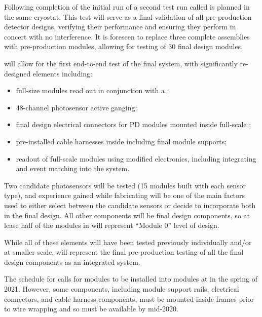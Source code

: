Following completion of the initial run of  a second test run called  is planned in the same cryostat.  This test will serve as a final validation of all pre-production  detector designs, verifying their performance and ensuring they perform in concert with no interference.  It is foreseen to replace three complete  assemblies with pre-production modules, allowing for testing of \num{30} final design  modules.  

 will allow for the first end-to-end test of the final  system, with significantly re-designed elements including:
\begin{itemize}
    \item full-size  modules read out in conjunction with a ;
    \item \num{48}-channel photosensor active ganging;
    \item final design electrical connectors for PD modules mounted inside full-scale ;
    \item pre-installed cable harnesses inside  including final module supports;
    \item readout of full-scale  modules using modified  electronics, including integrating  and  event matching into the  system.
\end{itemize}

Two candidate photosensors will be tested (\num{15} modules built with each sensor type), and experience gained while fabricating  will be one of the main factors used to either select between the candidate sensors or decide to incorporate both in the  final design.  All other components will be final design components, so at lease half of the  modules in  will represent ``Module 0'' level of design. 

While all of these elements will have been tested previously individually and/or at smaller scale,  will represent the final pre-production testing of all the final design components as an integrated system.

The schedule for  calls for  modules to be installed into  modules at  in the spring of 2021. However, some components, including module support rails, electrical connectors, and cable harness components, must be mounted inside  frames prior to wire wrapping and so must be available by mid-2020.

